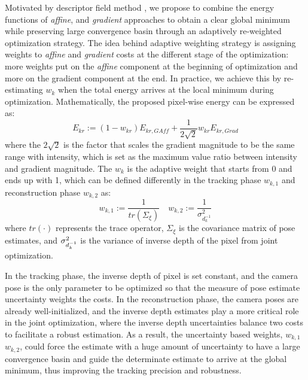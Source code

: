 Motivated by descriptor field method \cite{crivellaro2014robust}, we propose to combine the energy functions of {\em affine}, and {\em gradient} approaches to obtain a clear global minimum while preserving large convergence basin through an adaptively re-weighted optimization strategy. The idea behind adaptive weighting strategy is assigning weights to {\em affine} and {\em gradient} costs at the different stage of the optimization: more weights put on the {\em affine} component at the beginning of optimization and more on the {gradient} component at the end. In practice, we achieve this by re-estimating $w_k$ when the total energy arrives at the local minimum during optimization. Mathematically, the proposed pixel-wise energy can be expressed as:  
\begin{equation} \label{eq:illumination_combined}
E_{kr} :=  (1-w_{kr}) E_{kr,GAff} +\frac{1}{2 \sqrt{2} } w_{kr} E_{kr,Grad} 
\end{equation}
where the $2 \sqrt{2}$ is the factor that scales the gradient magnitude to be the same range with intensity, which is set as the maximum value ratio between intensity and gradient magnitude. The $w_k$ is the adaptive weight that starts from 0 and ends up with 1, which can be defined differently in the tracking phase $w_{k,1}$ and reconstruction phase $w_{k,2}$ as: 
\begin{equation} \label{eq:illumination_reweight}
w_{k,1} :=  \frac{1}{tr({\Sigma}_{\xi})} \quad w_{k,2} :=  \frac{1}{\sigma^2_{d^{-1}_k}}
\end{equation}
where $tr(\cdot)$ represents the trace operator, ${\Sigma}_{\xi}$ is the covariance matrix of pose estimates, and $\small \sigma^2_{d^{-1}_k}$ is the variance of inverse depth of the pixel from joint optimization. 

In the tracking phase, the inverse depth of pixel is set constant, and the camera pose is the only parameter to be optimized so that the measure of pose estimate uncertainty weights the costs. In the reconstruction phase, the camera poses are already well-initialized, and the inverse depth estimates play a more critical role in the joint optimization, where the inverse depth uncertainties balance two costs to facilitate a robust estimation. As a result, the uncertainty based weights, $w_{k,1}$ $w_{k,2}$, could force the estimate with a huge amount of uncertainty to have a large convergence basin and guide the determinate estimate to arrive at the global minimum, thus improving the tracking precision and robustness. 

